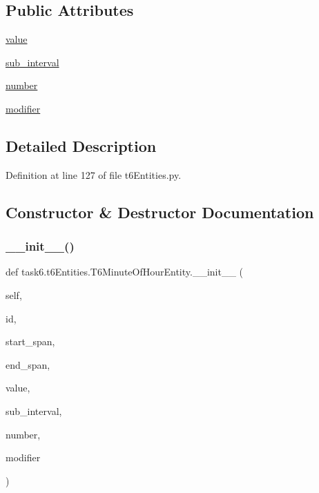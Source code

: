 \subsection*{Public Attributes}
\begin{DoxyCompactItemize}
\item 
\hyperlink{classtask6_1_1t6Entities_1_1T6MinuteOfHourEntity_abee1ba303976b6122dcf778c9e8763c6}{value}
\item 
\hyperlink{classtask6_1_1t6Entities_1_1T6MinuteOfHourEntity_a4c7879676d773211ec35ac3096b5d556}{sub\+\_\+interval}
\item 
\hyperlink{classtask6_1_1t6Entities_1_1T6MinuteOfHourEntity_a73b6e272b0a5092d03ddce3cf1745821}{number}
\item 
\hyperlink{classtask6_1_1t6Entities_1_1T6MinuteOfHourEntity_a1151c9a18ebeb805d6c8233f26d796b2}{modifier}
\end{DoxyCompactItemize}


\subsection{Detailed Description}


Definition at line 127 of file t6\+Entities.\+py.



\subsection{Constructor \& Destructor Documentation}
\mbox{\label{classtask6_1_1t6Entities_1_1T6MinuteOfHourEntity_a927ef60688052a692beea14ebb684e2c}} 
\subsubsection{\texorpdfstring{\+\_\+\+\_\+init\+\_\+\+\_\+()}{\_\_init\_\_()}}
{\footnotesize\ttfamily def task6.\+t6\+Entities.\+T6\+Minute\+Of\+Hour\+Entity.\+\_\+\+\_\+init\+\_\+\+\_\+ (\begin{DoxyParamCaption}\item[{}]{self,  }\item[{}]{id,  }\item[{}]{start\+\_\+span,  }\item[{}]{end\+\_\+span,  }\item[{}]{value,  }\item[{}]{sub\+\_\+interval,  }\item[{}]{number,  }\item[{}]{modifier }\end{DoxyParamCaption})}



